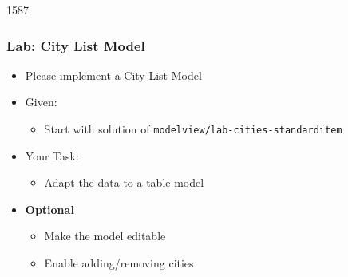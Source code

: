 \begin{slide}{1587}\frametitle{Lab: City List Model}
  \begin{itemize}
  \item Please implement a City List Model
  \item Given:
    \begin{itemize}
    \item Start with solution of \texttt{modelview/lab-cities-standarditem}
    \end{itemize}
  \item Your Task:
    \begin{itemize}
    \item Adapt the data to a table model
    \end{itemize}
  \item \textbf{Optional}
    \begin{itemize}
    \item Make the model editable
    \item Enable adding/removing cities
   \end{itemize}
 \end{itemize}
\end{slide}




